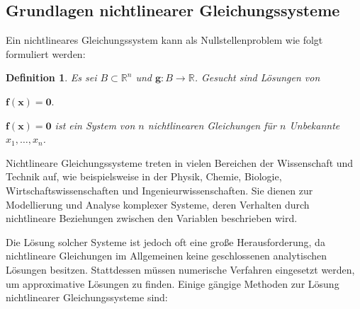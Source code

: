 \documentclass{article}
\theoremstyle{newline}
\newtheorem{definition}{Definition}[section]
\begin{document}
\begin{onehalfspace}
\begin{abstract}
	
\end{abstract}
\newpage


\tableofcontents	%
\thispagestyle{empty}

\newpage		

\section{Grundlagen nichtlinearer Gleichungssysteme}

Ein nichtlineares Gleichungssystem kann als Nullstellenproblem wie folgt formuliert werden:

\begin{definition}
	Es sei $B \subset \mathbb{R}^n$ und $\mathbf{g}: B \rightarrow \mathbb{R}$. Gesucht sind Lösungen von
	
	\begin{center}
		$\mathbf{f}(\mathbf{x}) = \mathbf{0}.$
	\end{center}
	
	$\mathbf{f}(\mathbf{x}) = \mathbf{0}$ ist ein System von $n$ nichtlinearen Gleichungen für $n$ Unbekannte $x_1, \dots, x_n$.
	\\
	
	\begin{center}
	\end{center}
	
\end{definition}

Nichtlineare Gleichungssysteme treten in vielen Bereichen der Wissenschaft und Technik auf, wie beispielsweise in der Physik, Chemie, Biologie, Wirtschaftswissenschaften und Ingenieurwissenschaften. Sie dienen zur Modellierung und Analyse komplexer Systeme, deren Verhalten durch nichtlineare Beziehungen zwischen den Variablen beschrieben wird.

Die Lösung solcher Systeme ist jedoch oft eine große Herausforderung, da nichtlineare Gleichungen im Allgemeinen keine geschlossenen analytischen Lösungen besitzen. Stattdessen müssen numerische Verfahren eingesetzt werden, um approximative Lösungen zu finden. Einige gängige Methoden zur Lösung nichtlinearer Gleichungssysteme sind:


\end{onehalfspace}
\end{document}
